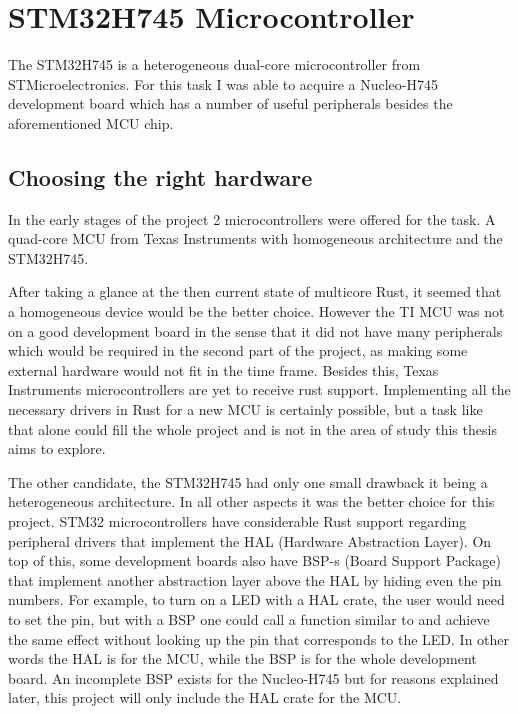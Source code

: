 \chapter{STM32H745 Microcontroller}

The STM32H745 is a heterogeneous dual-core microcontroller from STMicroelectronics. For this task I was able to acquire a Nucleo-H745 development board which has a number of useful peripherals besides the aforementioned MCU chip.

\section{Choosing the right hardware}

In the early stages of the project 2 microcontrollers were offered for the task. A quad-core MCU from Texas Instruments with homogeneous architecture and the STM32H745.

After taking a glance at the then current state of multicore Rust, it seemed that a homogeneous device would be the better choice. However the TI MCU was not on a good development board in the sense that it did not have many peripherals which would be required in the second part of the project, as making some external hardware would not fit in the time frame. Besides this, Texas Instruments microcontrollers are yet to receive rust support. Implementing all the necessary drivers in Rust for a new MCU is certainly possible, but a task like that alone could fill the whole project and is not in the area of study this thesis aims to explore.

The other candidate, the STM32H745 had only one small drawback it being a heterogeneous architecture. In all other aspects it was the better choice for this project. STM32 microcontrollers have considerable Rust support regarding peripheral drivers that implement the HAL (Hardware Abstraction Layer). On top of this, some development boards also have BSP-s (Board Support Package) that implement another abstraction layer above the HAL by hiding even the pin numbers. For example, to turn on a LED with a HAL crate, the user would need to set the  pin, but with a BSP one could call a function similar to  and achieve the same effect without looking up the pin that corresponds to the LED. In other words the HAL is for the MCU, while the BSP is for the whole development board. An incomplete BSP exists for the Nucleo-H745 but for reasons explained later, this project will only include the HAL crate for the MCU.

